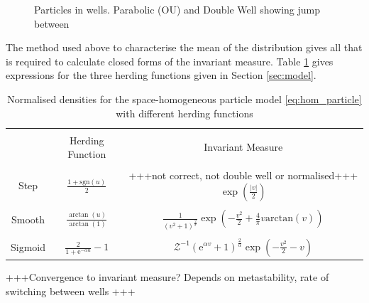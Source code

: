 \documentclass[11pt, a4paper, draft]{article}
\begin{document}
        \begin{figure}
            \centering
            \caption{Particles in wells. Parabolic (OU) and Double Well showing jump between}
            \label{fig:particle_wells}
        \end{figure}
        
        The method used above to characterise the mean of the distribution gives all that is required to calculate closed forms of the invariant measure. Table \ref{tab:space_particle_inv} gives expressions for the three herding functions given in Section \ref{sec:model}.
        \begin{table}
        \centering
        \begin{tabular}{|c|c|c|}
            \hline 
            & & \\[-0.5em] 
            & Herding Function & Invariant Measure \\[10pt]
            \hline
            & & \\[-0.5em] 
            Step & $\frac{1+\mathrm{sgn}(u)}{2}$ & +++not correct, not double well or normalised+++ $\exp\left(\frac{|v|}{2}\right)$ \\[10pt]
            \hline 
            & & \\[-0.5em]
            Smooth &$\frac{\arctan(u)}{\arctan(1)}$  & $\frac{1}{(v^2+1)^{\frac{2}{\pi}}} \exp\left( -\frac{v^2}{2}+\frac{4}{\pi}v\mathrm{arctan}(v)\right)$ \\[10pt]
            \hline 
            & & \\[-0.5em]
            Sigmoid & $\frac{2}{1+\mathrm{e}^{-\alpha u}} - 1$ & $ \mathcal{Z}^{-1}(\mathrm{e}^{\alpha v}+1)^{\frac{2}{\alpha}}\exp\left(-\frac{v^2}{2} - v\right)$ \\[10pt]
            \hline 
        \end{tabular}
        \caption{Normalised densities for the space-homogeneous particle model \eqref{eq:hom_particle} with different herding functions} 
        \label{tab:space_particle_inv}
        \end{table}
    
        +++Convergence to invariant measure? Depends on metastability, rate of switching between wells +++
     
\end{document}
